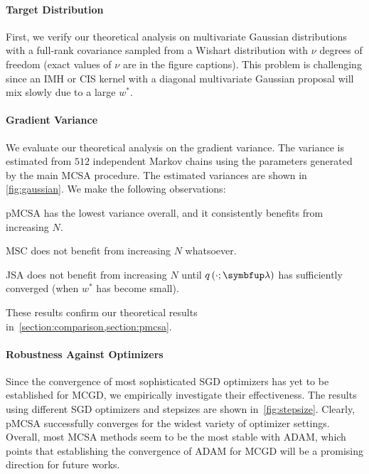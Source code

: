 \paragraph{Target Distribution}
First, we verify our theoretical analysis on multivariate Gaussian distributions with a full-rank covariance sampled from a Wishart distribution with \(\nu\) degrees of freedom (exact values of \(\nu\) are in the figure captions).
This problem is challenging since an IMH or CIS kernel with a diagonal multivariate Gaussian proposal will mix slowly due to a large \(w^*\).

\vspace{-0.1in}
\paragraph{Gradient Variance}
We evaluate our theoretical analysis on the gradient variance.
The variance is estimated from \(512\) independent Markov chains using the parameters generated by the main MCSA procedure.
The estimated variances are shown in \cref{fig:gaussian}.
We make the following observations:
\begin{enumerate*}[label=\textbf{(\roman*)}]
  \item pMCSA has the lowest variance overall, and it consistently benefits from increasing \(N\).
  \item MSC does not benefit from increasing \(N\) whatsoever.
  \item JSA does not benefit from increasing \(N\) until \(q\left(\cdot; \vlambda\right)\) has sufficiently converged (when \(w^*\) has become small).
\end{enumerate*}
These results confirm our theoretical results in~\cref{section:comparison,section:pmcsa}.

\vspace{-0.1in}
\paragraph{Robustness Against Optimizers}
Since the convergence of most sophisticated SGD optimizers has yet to be established for MCGD, we empirically investigate their effectiveness.
The results using different SGD optimizers and stepsizes are shown in~\cref{fig:stepsize}.
Clearly, pMCSA successfully converges for the widest variety of optimizer settings.
Overall, most MCSA methods seem to be the most stable with ADAM, which points that establishing the convergence of ADAM for MCGD will be a promising direction for future works.

